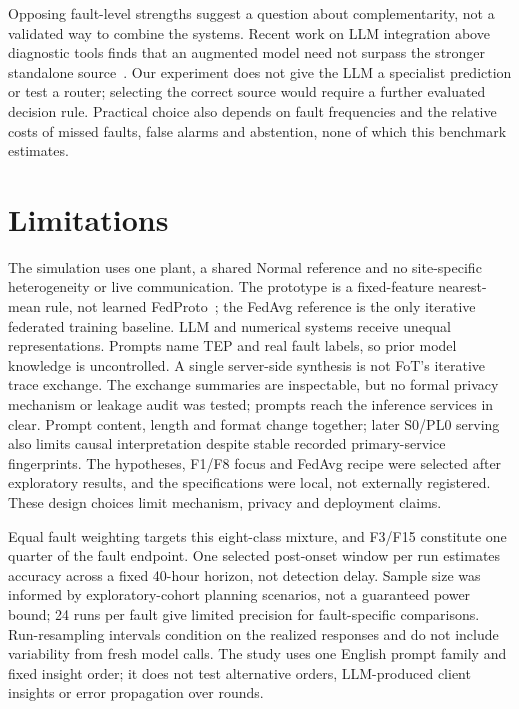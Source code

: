 \documentclass[conference]{IEEEtran}
\newcommand{\cond}[1]{\textsf{#1}}
\begin{document}
Opposing fault-level strengths suggest a question about complementarity, not a validated way to combine the systems. Recent work on LLM integration above diagnostic tools finds that an augmented model need not surpass the stronger standalone source~\cite{kim2026complementarity}. Our experiment does not give the LLM a specialist prediction or test a router; selecting the correct source would require a further evaluated decision rule. Practical choice also depends on fault frequencies and the relative costs of missed faults, false alarms and abstention, none of which this benchmark estimates.

\section{Limitations}
\label{sec:limits}
The simulation uses one plant, a shared Normal reference and no site-specific heterogeneity or live communication. The prototype is a fixed-feature nearest-mean rule, not learned FedProto~\cite{tan2022fedproto}; the FedAvg reference is the only iterative federated training baseline. LLM and numerical systems receive unequal representations. Prompts name TEP and real fault labels, so prior model knowledge is uncontrolled. A single server-side synthesis is not FoT's iterative trace exchange. The exchange summaries are inspectable, but no formal privacy mechanism or leakage audit was tested; prompts reach the inference services in clear. Prompt content, length and format change together; later \cond{S0}/\cond{PL0} serving also limits causal interpretation despite stable recorded primary-service fingerprints. The hypotheses, F1/F8 focus and FedAvg recipe were selected after exploratory results, and the specifications were local, not externally registered. These design choices limit mechanism, privacy and deployment claims.

Equal fault weighting targets this eight-class mixture, and F3/F15 constitute one quarter of the fault endpoint. One selected post-onset window per run estimates accuracy across a fixed 40-hour horizon, not detection delay. Sample size was informed by exploratory-cohort planning scenarios, not a guaranteed power bound; 24 runs per fault give limited precision for fault-specific comparisons. Run-resampling intervals condition on the realized responses and do not include variability from fresh model calls. The study uses one English prompt family and fixed insight order; it does not test alternative orders, LLM-produced client insights or error propagation over rounds.
\end{document}
